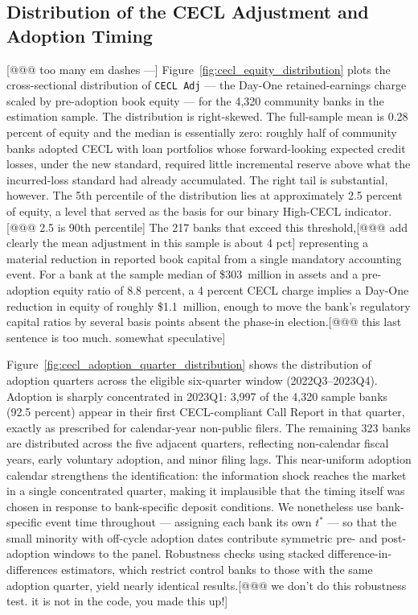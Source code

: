 \subsection{Distribution of the CECL Adjustment and Adoption Timing}
\label{sec:descriptive:distribution}
[@@@ too many em dashes ---]
Figure~\ref{fig:cecl_equity_distribution} plots the cross-sectional distribution
of \texttt{CECL Adj} --- the Day-One retained-earnings charge scaled by
pre-adoption book equity --- for the 4,320 community banks in the estimation
sample.  The distribution is right-skewed.  The full-sample mean is 0.28 percent
of equity and the median is essentially zero: roughly half of community banks
adopted CECL with loan portfolios whose forward-looking expected credit losses,
under the new standard, required little incremental reserve above what the
incurred-loss standard had already accumulated.  The right tail is
substantial, however.  The 5th percentile of the distribution lies at
approximately 2.5 percent of equity, a level that served as the basis for
our binary High-CECL indicator.[@@@ 2.5 is 90th percentile]  The 217 banks that exceed this threshold,[@@@ add clearly the mean adjustment in this sample is about 4 pct] representing a material reduction in reported book capital from a single
mandatory accounting event.  For a bank at the sample median of \$303~million
in assets and a pre-adoption equity ratio of 8.8 percent, a 4 percent CECL
charge implies a Day-One reduction in equity of roughly \$1.1~million, enough
to move the bank's regulatory capital ratios by several basis points absent
the phase-in election.[@@@ this last sentence is too much. somewhat speculative]

Figure~\ref{fig:cecl_adoption_quarter_distribution} shows the distribution of
adoption quarters across the eligible six-quarter window (2022Q3--2023Q4).
Adoption is sharply concentrated in 2023Q1: 3,997 of the 4,320 sample banks
(92.5 percent) appear in their first CECL-compliant Call Report in that quarter,
exactly as prescribed for calendar-year non-public filers.  The remaining
323 banks are distributed across the five adjacent quarters, reflecting
non-calendar fiscal years, early voluntary adoption, and minor filing lags.
This near-uniform adoption calendar strengthens the identification: the
information shock reaches the market in a single concentrated quarter, making
it implausible that the timing itself was chosen in response to bank-specific
deposit conditions.  We nonetheless use bank-specific event time throughout ---
assigning each bank its own $t^{*}$ --- so that the small minority with
off-cycle adoption dates contribute symmetric pre- and post-adoption windows
to the panel.  Robustness checks using stacked difference-in-differences
estimators, which restrict control banks to those with the same adoption
quarter, yield nearly identical results.[@@@ we don't do this robustness test. it is not in the code, you made this up!]

